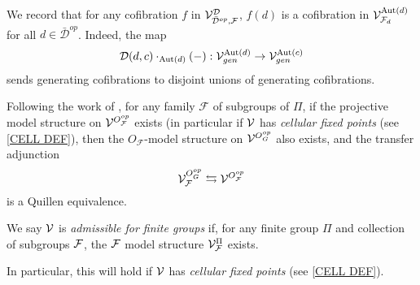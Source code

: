 \documentclass[a4paper,10pt]{article}%
\begin{document}
\begin{remark}
  \label{LEVEL_COFIB_REMARK}
  We record that for any cofibration $f$ in $\mathcal V^{\mathcal D}_{{\bar{\mathcal D}^{op}}, \mathcal F}$, $f(d)$ is a cofibration in $\mathcal V^{\mathrm{Aut}(d)}_{\mathcal F_d}$ for all $d\in {\bar{\mathcal D}^{op}}$. Indeed, the map
  \[
  \mathcal D(d,c) \cdot_{\mathrm{Aut}(d)}(-): \mathcal V^{\mathrm{Aut}(d)}_{gen} \to \mathcal V^{\mathrm{Aut}(c)}_{gen}
  \]
  sends generating cofibrations to disjoint unions of generating cofibrations.
\end{remark}

\begin{example}
  Following the work of \cite{Ste16}, for any family $\mathcal F$ of subgroups of $\Pi$, if the projective model structure on  $\mathcal V^{O_{\mathcal F}^{op}}$ exists (in particular if $\mathcal V$ has \textit{cellular fixed points} (see \ref{CELL DEF}), then the $O_{\mathcal F}$-model structure on $\mathcal V^{O_G^{op}}$ also exists, and the transfer adjunction
\[
\mathcal V^{O_G^{op}}_{\mathcal F} \leftrightarrows \mathcal V^{O_{\mathcal F}^{op}}
\]
is a Quillen equivalence. 
\end{example}


\begin{definition}
  We say $\mathcal V$ is \textit{admissible for finite groups} if, for any finite group $\Pi$ and collection of subgroups $\mathcal F$, the $\mathcal F$ model structure $\mathcal V^\Pi_{\mathcal F}$ exists.

  In particular, this will hold if $\mathcal V$ has \textit{cellular fixed points} (see \ref{CELL DEF}). 
\end{definition}
\end{document}
